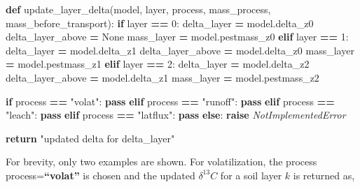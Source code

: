 \documentclass[]{article}
\newenvironment{Shaded}{\begin{snugshade}}{\end{snugshade}}
\newcommand{\KeywordTok}[1]{\textcolor[rgb]{0.13,0.29,0.53}{\textbf{{#1}}}}
\newcommand{\DecValTok}[1]{\textcolor[rgb]{0.00,0.00,0.81}{{#1}}}
\newcommand{\StringTok}[1]{\textcolor[rgb]{0.31,0.60,0.02}{{#1}}}
\newcommand{\VariableTok}[1]{\textcolor[rgb]{0.00,0.00,0.00}{{#1}}}
\newcommand{\ControlFlowTok}[1]{\textcolor[rgb]{0.13,0.29,0.53}{\textbf{{#1}}}}
\newcommand{\OperatorTok}[1]{\textcolor[rgb]{0.81,0.36,0.00}{\textbf{{#1}}}}
\newcommand{\PreprocessorTok}[1]{\textcolor[rgb]{0.56,0.35,0.01}{\textit{{#1}}}}
\newcommand{\NormalTok}[1]{{#1}}
\begin{document}
\begin{Shaded}
\begin{Highlighting}[]

\KeywordTok{def} \NormalTok{update_layer_delta(model, layer, process, mass_process, mass_before_transport):}
    \ControlFlowTok{if} \NormalTok{layer }\OperatorTok{==} \DecValTok{0}\NormalTok{:}
      \NormalTok{delta_layer }\OperatorTok{=} \NormalTok{model.delta_z0}
      \NormalTok{delta_layer_above }\OperatorTok{=} \VariableTok{None}
      \NormalTok{mass_layer }\OperatorTok{=} \NormalTok{model.pestmass_z0}
    \ControlFlowTok{elif} \NormalTok{layer }\OperatorTok{==} \DecValTok{1}\NormalTok{:}
        \NormalTok{delta_layer }\OperatorTok{=} \NormalTok{model.delta_z1}
        \NormalTok{delta_layer_above }\OperatorTok{=} \NormalTok{model.delta_z0}
        \NormalTok{mass_layer }\OperatorTok{=} \NormalTok{model.pestmass_z1}
    \ControlFlowTok{elif} \NormalTok{layer }\OperatorTok{==} \DecValTok{2}\NormalTok{:}
        \NormalTok{delta_layer }\OperatorTok{=} \NormalTok{model.delta_z2}
        \NormalTok{delta_layer_above }\OperatorTok{=} \NormalTok{model.delta_z1}
        \NormalTok{mass_layer }\OperatorTok{=} \NormalTok{model.pestmass_z2}
        
    \ControlFlowTok{if} \NormalTok{process }\OperatorTok{==} \StringTok{"volat"}\NormalTok{:}
        \ControlFlowTok{pass}
    \ControlFlowTok{elif} \NormalTok{process }\OperatorTok{==} \StringTok{"runoff"}\NormalTok{:}
        \ControlFlowTok{pass}
    \ControlFlowTok{elif} \NormalTok{process }\OperatorTok{==} \StringTok{"leach"}\NormalTok{:}
        \ControlFlowTok{pass}
    \ControlFlowTok{elif} \NormalTok{process }\OperatorTok{==} \StringTok{"latflux"}\NormalTok{:}
        \ControlFlowTok{pass}
    \ControlFlowTok{else}\NormalTok{:}
        \ControlFlowTok{raise} \PreprocessorTok{NotImplementedError}
    
    \ControlFlowTok{return} \StringTok{"updated delta for delta_layer"}
                       
\end{Highlighting}
\end{Shaded}

For brevity, only two examples are shown. For volatilization, the
process process=\textbf{``volat''} is chosen and the updated
\(\delta ^{13}C\) for a soil layer \(k\) is returned as,
\end{document}
